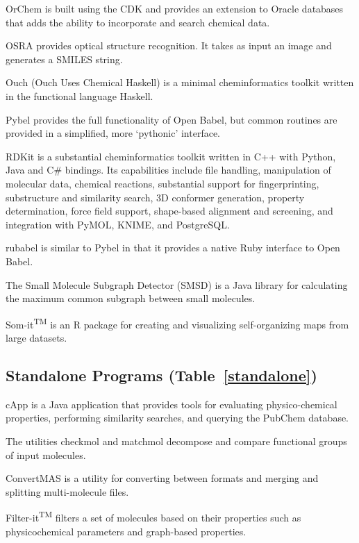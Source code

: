 OrChem is built using the CDK and provides an extension to Oracle databases that adds the ability to incorporate and search chemical data.

OSRA \cite{Filippov_2009} provides optical structure recognition. It takes as input an image and generates a SMILES string.

Ouch (Ouch Uses Chemical Haskell) is a minimal cheminformatics toolkit written in the functional language Haskell.

Pybel \cite{pybel} provides the full functionality of Open Babel, but common routines are provided in a simplified, more `pythonic' interface.

RDKit is a substantial cheminformatics toolkit written in C++ with Python, Java and C\# bindings.  Its capabilities include file handling, manipulation of molecular data, chemical reactions, substantial support for fingerprinting, substructure and similarity search, 3D conformer generation, property determination, force field support, shape-based alignment and screening, and integration with PyMOL, KNIME, and PostgreSQL.

rubabel \cite{Smith_2013} is similar to Pybel in that it provides a native Ruby interface to Open Babel.

The Small Molecule Subgraph Detector (SMSD) \cite{Rahman_2009} is a Java library for calculating the maximum common subgraph between small molecules.

Som-it\textsuperscript{TM}  is an R package for creating and visualizing self-organizing maps from large datasets.


\subsection*{Standalone Programs (Table~\ref{standalone})}

cApp \cite{Amani_2015} is a Java application that provides tools for evaluating physico-chemical properties, performing similarity searches, and querying the PubChem database.

The utilities checkmol and matchmol \cite{Haider_2010} decompose and compare functional groups of input molecules.

ConvertMAS is a utility for converting between formats and merging and splitting multi-molecule files.

Filter-it\textsuperscript{TM} filters a set of molecules based on their properties such as physicochemical parameters and graph-based properties. 

